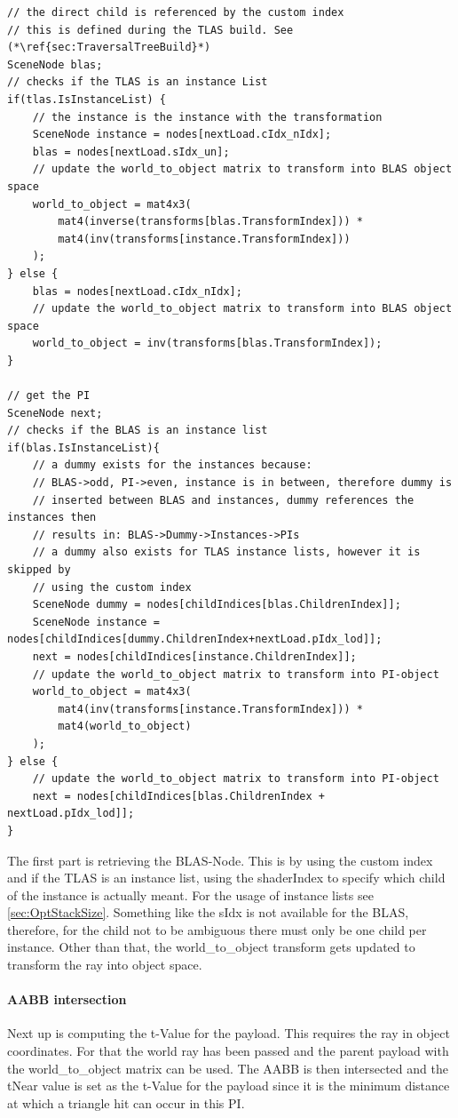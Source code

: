 \begin{lstlisting}
// the direct child is referenced by the custom index 
// this is defined during the TLAS build. See (*\ref{sec:TraversalTreeBuild}*)
SceneNode blas;
// checks if the TLAS is an instance List
if(tlas.IsInstanceList)	{
    // the instance is the instance with the transformation
	SceneNode instance = nodes[nextLoad.cIdx_nIdx];
	blas = nodes[nextLoad.sIdx_un];
	// update the world_to_object matrix to transform into BLAS object space
	world_to_object = mat4x3(
	    mat4(inverse(transforms[blas.TransformIndex])) *
	    mat4(inv(transforms[instance.TransformIndex]))
	);
} else {
	blas = nodes[nextLoad.cIdx_nIdx];
	// update the world_to_object matrix to transform into BLAS object space
	world_to_object = inv(transforms[blas.TransformIndex]);
}

// get the PI
SceneNode next;
// checks if the BLAS is an instance list
if(blas.IsInstanceList){
    // a dummy exists for the instances because:
    // BLAS->odd, PI->even, instance is in between, therefore dummy is
    // inserted between BLAS and instances, dummy references the instances then
    // results in: BLAS->Dummy->Instances->PIs
    // a dummy also exists for TLAS instance lists, however it is skipped by 
    // using the custom index
	SceneNode dummy = nodes[childIndices[blas.ChildrenIndex]];
	SceneNode instance = nodes[childIndices[dummy.ChildrenIndex+nextLoad.pIdx_lod]];
	next = nodes[childIndices[instance.ChildrenIndex]];
	// update the world_to_object matrix to transform into PI-object
	world_to_object = mat4x3(
	    mat4(inv(transforms[instance.TransformIndex])) * 
	    mat4(world_to_object)
	);
} else {
	// update the world_to_object matrix to transform into PI-object
	next = nodes[childIndices[blas.ChildrenIndex + nextLoad.pIdx_lod]];
}
\end{lstlisting}

The first part is retrieving the BLAS-Node. This is by using the custom index and if the TLAS is an instance list, using the shaderIndex to specify which child of the instance is actually meant. For the usage of instance lists see \ref{sec:OptStackSize}. Something like the sIdx is not available for the BLAS, therefore, for the child not to be ambiguous there must only be one child per instance. Other than that, the world\_to\_object transform gets updated to transform the ray into object space.
\newpage
\paragraph{AABB intersection}
Next up is computing the t-Value for the payload. This requires the ray in object coordinates. For that the world ray has been passed and the parent payload with the world\_to\_object matrix can be used. The AABB is then intersected and the tNear value is set as the t-Value for the payload since it is the minimum distance at which a triangle hit can occur in this PI.

